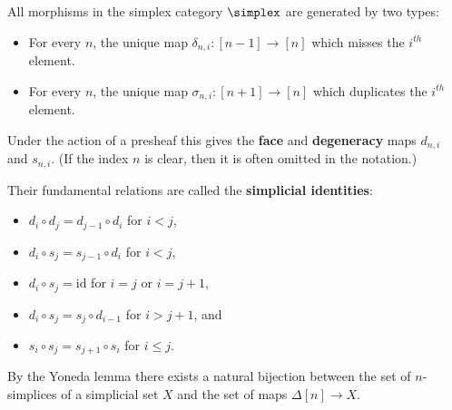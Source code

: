    \begin{property}
        All morphisms in the simplex category $\simplex$ are generated by two types:
        \begin{itemize}
            \item For every $n$, the unique map $\delta_{n,i}:[n-1]\rightarrow[n]$ which misses the $i^{th}$ element.
            \item For every $n$, the unique map $\sigma_{n,i}:[n+1]\rightarrow[n]$ which duplicates the $i^{th}$ element.
        \end{itemize}
        Under the action of a presheaf this gives the \textbf{face} and \textbf{degeneracy} maps $d_{n, i}$ and $s_{n, i}$. (If the index $n$ is clear, then it is often omitted in the notation.)

        Their fundamental relations are called the \textbf{simplicial identities}:
        \begin{itemize}
            \item $d_i\circ d_j = d_{j-1}\circ d_i$ for $i<j$,
            \item $d_i\circ s_j = s_{j-1}\circ d_i$ for $i<j$,
            \item $d_i\circ s_j = \text{id}$ for $i=j$ or $i=j+1$,
            \item $d_i\circ s_j = s_j\circ d_{i-1}$ for $i>j+1$, and
            \item $s_i\circ s_j = s_{j+1}\circ s_i$ for $i\leq j$.
        \end{itemize}
    \end{property}

    \begin{property}
        By the Yoneda lemma there exists a natural bijection between the set of $n$-simplices of a simplicial set $X$ and the set of maps $\Delta[n]\rightarrow X$.
    \end{property}


